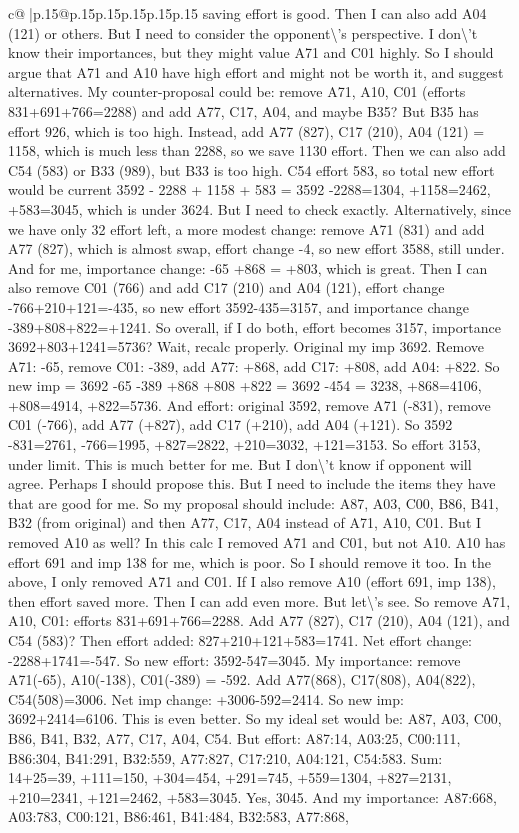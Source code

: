 \documentclass{article}
\begin{document}
{\begin{supertabular}{c@{$\;$}|p{.15\linewidth}@{}p{.15\linewidth}p{.15\linewidth}p{.15\linewidth}p{.15\linewidth}p{.15\linewidth}}
{{{saving effort is good. Then I can also add A04 (121) or others. But I need to consider the opponent\textbackslash{}'s perspective. I don\textbackslash{}'t know their importances, but they might value A71 and C01 highly. So I should argue that A71 and A10 have high effort and might not be worth it, and suggest alternatives. My counter{-}proposal could be: remove A71, A10, C01 (efforts 831+691+766=2288) and add A77, C17, A04, and maybe B35? But B35 has effort 926, which is too high. Instead, add A77 (827), C17 (210), A04 (121) = 1158, which is much less than 2288, so we save 1130 effort. Then we can also add C54 (583) or B33 (989), but B33 is too high. C54 effort 583, so total new effort would be current 3592 {-} 2288 + 1158 + 583 = 3592 {-}2288=1304, +1158=2462, +583=3045, which is under 3624. But I need to check exactly. Alternatively, since we have only 32 effort left, a more modest change: remove A71 (831) and add A77 (827), which is almost swap, effort change {-}4, so new effort 3588, still under. And for me, importance change: {-}65 +868 = +803, which is great. Then I can also remove C01 (766) and add C17 (210) and A04 (121), effort change {-}766+210+121={-}435, so new effort 3592{-}435=3157, and importance change {-}389+808+822=+1241. So overall, if I do both, effort becomes 3157, importance 3692+803+1241=5736? Wait, recalc properly. Original my imp 3692. Remove A71: {-}65, remove C01: {-}389, add A77: +868, add C17: +808, add A04: +822. So new imp = 3692 {-}65 {-}389 +868 +808 +822 = 3692 {-}454 = 3238, +868=4106, +808=4914, +822=5736. And effort: original 3592, remove A71 ({-}831), remove C01 ({-}766), add A77 (+827), add C17 (+210), add A04 (+121). So 3592 {-}831=2761, {-}766=1995, +827=2822, +210=3032, +121=3153. So effort 3153, under limit. This is much better for me. But I don\textbackslash{}'t know if opponent will agree. Perhaps I should propose this. But I need to include the items they have that are good for me. So my proposal should include: A87, A03, C00, B86, B41, B32 (from original) and then A77, C17, A04 instead of A71, A10, C01. But I removed A10 as well? In this calc I removed A71 and C01, but not A10. A10 has effort 691 and imp 138 for me, which is poor. So I should remove it too. In the above, I only removed A71 and C01. If I also remove A10 (effort 691, imp 138), then effort saved more. Then I can add even more. But let\textbackslash{}'s see. So remove A71, A10, C01: efforts 831+691+766=2288. Add A77 (827), C17 (210), A04 (121), and C54 (583)? Then effort added: 827+210+121+583=1741. Net effort change: {-}2288+1741={-}547. So new effort: 3592{-}547=3045. My importance: remove A71({-}65), A10({-}138), C01({-}389) = {-}592. Add A77(868), C17(808), A04(822), C54(508)=3006. Net imp change: +3006{-}592=2414. So new imp: 3692+2414=6106. This is even better. So my ideal set would be: A87, A03, C00, B86, B41, B32, A77, C17, A04, C54. But effort: A87:14, A03:25, C00:111, B86:304, B41:291, B32:559, A77:827, C17:210, A04:121, C54:583. Sum: 14+25=39, +111=150, +304=454, +291=745, +559=1304, +827=2131, +210=2341, +121=2462, +583=3045. Yes, 3045. And my importance: A87:668, A03:783, C00:121, B86:461, B41:484, B32:583, A77:868, }}}
\end{supertabular}}
\end{document}
